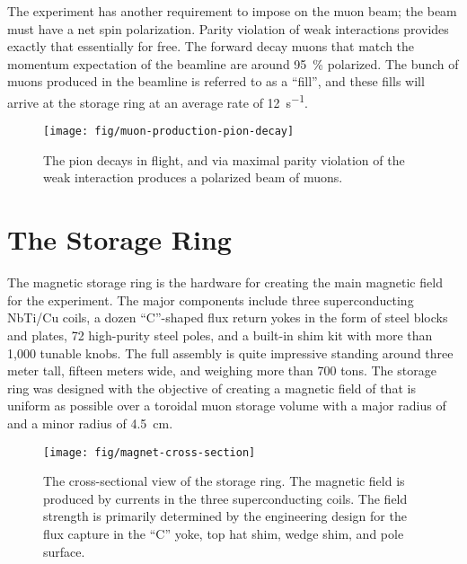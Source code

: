 The experiment has another requirement to impose on the muon beam; the beam must have a net spin polarization.  Parity violation of weak interactions provides exactly that essentially for free.  The forward decay muons that match the momentum expectation of the beamline are around \SI{95}{\percent} polarized.  The bunch of muons produced in the beamline is referred to as a ``fill'', and these fills will arrive at the storage ring at an average rate of \SI{12}{\second^{-1}}\cite{e989-tdr}.

\begin{figure}
\label{fig:muon-production-pion-decay}
\texttt{[image: fig/muon-production-pion-decay]}
\caption{The pion decays in flight, and via maximal parity violation of the weak interaction produces a polarized beam of muons. }
\end{figure}

\section{The Storage Ring} \label{sec:storage-ring}

The magnetic storage ring is the hardware for creating the main magnetic field for the experiment.  The major components include three superconducting NbTi/Cu coils, a dozen ``C''-shaped flux return yokes in the form of steel blocks and plates, 72 high-purity steel poles, and a built-in shim kit with more than 1,000 tunable knobs.  The full assembly is quite impressive standing around three meter tall, fifteen meters wide, and weighing more than 700 tons.  The storage ring was designed with the objective of creating a magnetic field of \bmagic that is uniform as possible over a toroidal muon storage volume with a major radius of \rmagic and a minor radius of \SI{4.5}{\cm}.

\begin{figure}
\texttt{[image: fig/magnet-cross-section]}
\caption{The cross-sectional view of the storage ring.  The magnetic field is produced by currents in the three superconducting coils.  The field strength is primarily determined by the engineering design for the flux capture in the ``C'' yoke, top hat shim, wedge shim, and pole surface.}
\label{fig:magnet-cross-section}
\end{figure}

